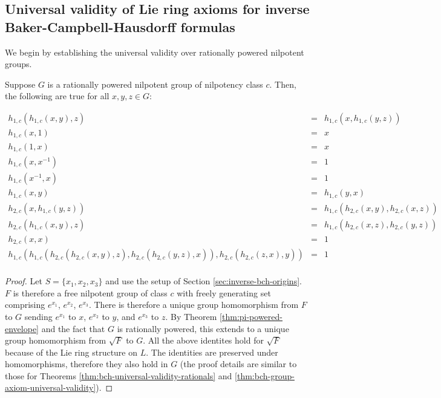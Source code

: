 \subsection{Universal validity of Lie ring axioms for inverse Baker-Campbell-Hausdorff formulas}

We begin by establishing the universal validity over rationally
powered nilpotent groups.

\begin{theorem}\label{thm:inverse-bch-lie-ring-axiom-universal-validity}
  Suppose $G$ is a rationally powered nilpotent group of nilpotency
  class $c$. Then, the following are true for all $x,y,z \in G$:

  \begin{small}
  \begin{eqnarray*}
    h_{1,c}(h_{1,c}(x,y),z) & = & h_{1,c}(x,h_{1,c}(y,z)) \\
    h_{1,c}(x,1) & = & x \\
    h_{1,c}(1,x) & = & x \\
    h_{1,c}(x,x^{-1}) & = & 1 \\
    h_{1,c}(x^{-1},x) & = & 1 \\
    h_{1,c}(x,y) & = & h_{1,c}(y,x)\\
    h_{2,c}(x,h_{1,c}(y,z)) & = & h_{1,c}(h_{2,c}(x,y),h_{2,c}(x,z))\\
    h_{2,c}(h_{1,c}(x,y),z) & = & h_{1,c}(h_{2,c}(x,z),h_{2,c}(y,z))\\
    h_{2,c}(x,x) & = & 1 \\
    h_{1,c}(h_{1,c}(h_{2,c}(h_{2,c}(x,y),z),h_{2,c}(h_{2,c}(y,z),x)),h_{2,c}(h_{2,c}(z,x),y)) & = & 1 \\
  \end{eqnarray*}
  \end{small}
\end{theorem}

\begin{proof}
  Let $S = \{x_1,x_2,x_3\}$ and use the setup of Section
  \ref{sec:inverse-bch-origins}. $F$ is therefore a free nilpotent
  group of class $c$ with freely generating set comprising $e^{x_1}$,
  $e^{x_2}$, $e^{x_3}$. There is therefore a unique group homomorphism
  from $F$ to $G$ sending $e^{x_1}$ to $x$, $e^{x_2}$ to $y$, and
  $e^{x_3}$ to $z$. By Theorem \ref{thm:pi-powered-envelope} and the
  fact that $G$ is rationally powered, this extends to a unique group
  homomorphism from $\sqrt{F}$ to $G$. All the above identites hold
  for $\sqrt{F}$ because of the Lie ring structure on $L$. The
  identities are preserved under homomorphisms, therefore they also
  hold in $G$ (the proof details are similar to those for Theorems
  \ref{thm:bch-universal-validity-rationals} and
  \ref{thm:bch-group-axiom-universal-validity}).
\end{proof}

